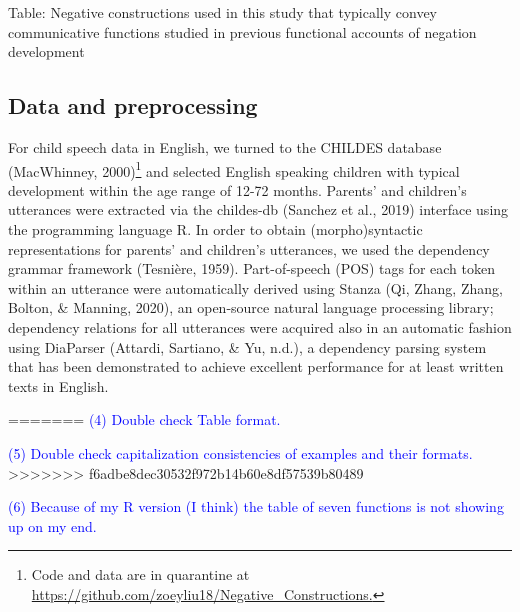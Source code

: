 \documentclass[
  english,
  man,floatsintext]{apa6}
\begin{document}
Table: \label{tab:constructions} Negative constructions used in this study that typically convey communicative functions studied in previous functional accounts of negation development

\hypertarget{data-and-preprocessing}{%
\subsection{Data and preprocessing}\label{data-and-preprocessing}}

For child speech data in English, we turned to the CHILDES database (MacWhinney, 2000)\footnote{Code and data are in quarantine at \url{https://github.com/zoeyliu18/Negative_Constructions.}} and selected English speaking children with typical development within the age range of 12-72 months. Parents' and children's utterances were extracted via the childes-db (Sanchez et al., 2019) interface using the programming language R. In order to obtain (morpho)syntactic representations for parents' and children's utterances, we used the dependency grammar framework (Tesnière, 1959). Part-of-speech (POS) tags for each token within an utterance were automatically derived using Stanza (Qi, Zhang, Zhang, Bolton, \& Manning, 2020), an open-source natural language processing library; dependency relations for all utterances were acquired also in an automatic fashion using DiaParser (Attardi, Sartiano, \& Yu, n.d.), a dependency parsing system that has been demonstrated to achieve excellent performance for at least written texts in English.

=======
\textcolor{blue}{(4) Double check Table format.}

\textcolor{blue}{(5) Double check capitalization consistencies of examples and their formats.}
\textgreater\textgreater\textgreater\textgreater\textgreater\textgreater\textgreater{} f6adbe8dec30532f972b14b60e8df57539b80489

\textcolor{blue}{(6) Because of my R version (I think) the table of seven functions is not showing up on my end.}
\end{document}
